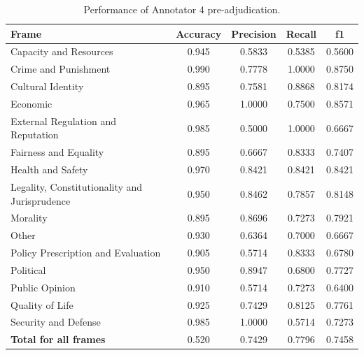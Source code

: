 \documentclass[
10pt, %
a4paper, %
oneside, %
headinclude,footinclude, %
] {book}%
\begin{document}
\begin{table}[htbp]
\centering
\begin{tabular}{|l|c|c|c|c|}
\hline
\textbf{Frame} & \textbf{Accuracy} & \textbf{Precision} & \textbf{Recall} & \textbf{f1} \\
\hline
Capacity and Resources & 0.945 & 0.5833 & 0.5385 & 0.5600 \\\hline
Crime and Punishment & 0.990 & 0.7778 & 1.0000 & 0.8750 \\\hline
Cultural Identity & 0.895 & 0.7581 & 0.8868 & 0.8174 \\\hline
Economic & 0.965 & 1.0000 & 0.7500 & 0.8571 \\\hline
External Regulation and Reputation & 0.985 & 0.5000 & 1.0000 & 0.6667 \\\hline
Fairness and Equality & 0.895 & 0.6667 & 0.8333 & 0.7407 \\\hline
Health and Safety & 0.970 & 0.8421 & 0.8421 & 0.8421 \\\hline
Legality, Constitutionality and Jurisprudence & 0.950 & 0.8462 & 0.7857 & 0.8148 \\\hline
Morality & 0.895 & 0.8696 & 0.7273 & 0.7921 \\\hline
Other & 0.930 & 0.6364 & 0.7000 & 0.6667 \\\hline
Policy Prescription and Evaluation & 0.905 & 0.5714 & 0.8333 & 0.6780 \\\hline
Political & 0.950 & 0.8947 & 0.6800 & 0.7727 \\\hline
Public Opinion & 0.910 & 0.5714 & 0.7273 & 0.6400 \\\hline
Quality of Life & 0.925 & 0.7429 & 0.8125 & 0.7761 \\\hline
Security and Defense & 0.985 & 1.0000 & 0.5714 & 0.7273 \\
\hline
\textbf{Total for all frames} & 0.520 & 0.7429 & 0.7796 & 0.7458 \\
\hline
\end{tabular}
\textbf{}\caption{Performance of Annotator 4 pre-adjudication.}
\label{tab:pre_annotator4_performance}
\end{table}

\newpage
\end{document}
